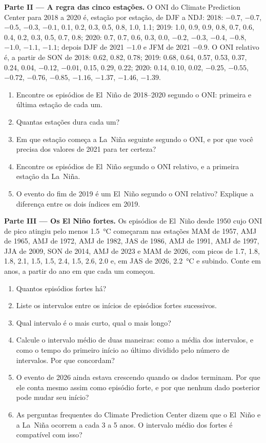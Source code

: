 \begin{problem}
\medskip\noindent\textbf{Parte II --- A regra das cinco estações.}
O ONI do Climate Prediction Center para 2018 a 2020 é, estação por estação, de DJF a
NDJ: 2018: $-0.7$, $-0.7$, $-0.5$, $-0.3$, $-0.1$, 0.1, 0.2, 0.3, 0.5, 0.8, 1.0, 1.1; 2019: 1.0,
0.9, 0.9, 0.8, 0.7, 0.6, 0.4, 0.2, 0.3, 0.5, 0.7, 0.8; 2020: 0.7, 0.7, 0.6, 0.3, 0.0, $-0.2$,
$-0.3$, $-0.4$, $-0.8$, $-1.0$, $-1.1$, $-1.1$; depois DJF de 2021 $-1.0$ e JFM de 2021 $-0.9$. O
ONI relativo é, a partir de SON de 2018: 0.62, 0.82, 0.78; 2019: 0.68, 0.64, 0.57, 0.53, 0.37, 0.24,
0.04, $-0.12$, $-0.01$, 0.15, 0.29, 0.22; 2020: 0.14, 0.10, 0.02, $-0.25$, $-0.55$, $-0.72$,
$-0.76$, $-0.85$, $-1.16$, $-1.37$, $-1.46$, $-1.39$.
\begin{enumerate}[resume]
  \item Encontre os episódios de El~Niño de 2018--2020 segundo o ONI: primeira e última estação de cada um.
  \item Quantas estações dura cada um?
  \item Em que estação começa a La~Niña seguinte segundo o ONI, e por que você precisa dos
        valores de 2021 para ter certeza?
  \item Encontre os episódios de El~Niño segundo o ONI relativo, e a primeira estação da La~Niña.
  \item O evento do fim de 2019 é um El~Niño segundo o ONI relativo? Explique a diferença
        entre os dois índices em 2019.
\end{enumerate}

\medskip\noindent\textbf{Parte III --- Os El Niño fortes.}
Os episódios de El~Niño desde 1950 cujo ONI de pico atingiu pelo menos \qty{1.5}{\celsius} começaram nas
estações MAM de 1957, AMJ de 1965, AMJ de 1972, AMJ de 1982, JAS de 1986, AMJ de 1991, AMJ de 1997, JJA de 2009, SON de 2014,
AMJ de 2023 e MAM de 2026, com picos de 1.7, 1.8, 1.8, 2.1, 1.5, 1.5, 2.4, 1.5, 2.6, 2.0 e, em
JAS de 2026, \qty{2.2}{\celsius} e subindo. Conte em anos, a partir do ano em que cada um começou.
\begin{enumerate}[resume]
  \item Quantos episódios fortes há?
  \item Liste os intervalos entre os inícios de episódios fortes sucessivos.
  \item Qual intervalo é o mais curto, qual o mais longo?
  \item Calcule o intervalo médio de duas maneiras: como a média dos intervalos, e como o tempo
        do primeiro início ao último dividido pelo número de intervalos. Por que concordam?
  \item O evento de 2026 ainda estava crescendo quando os dados terminam. Por que ele conta mesmo assim
        como episódio forte, e por que nenhum dado posterior pode mudar seu início?
  \item As perguntas frequentes do Climate Prediction Center dizem que o El~Niño e a La~Niña ocorrem a cada 3 a 5
        anos. O intervalo médio dos fortes é compatível com isso?
\end{enumerate}


\end{problem}
